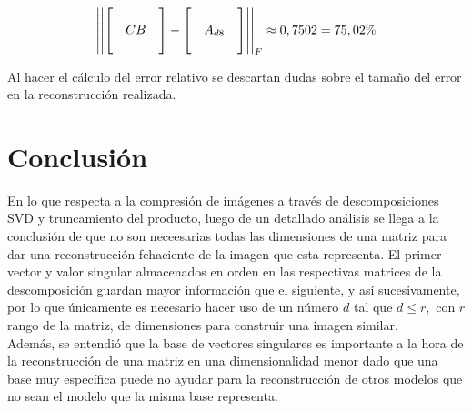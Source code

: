 \documentclass[12pt,a4]{article} %
\begin{document}
\begin{equation}
    \centering
    \left|\left|\begin{bmatrix}
            &   &   \\
            &CB &   \\
            &   &   
    \end{bmatrix} - \begin{bmatrix}
            &   &   \\
            &A_{d8}&    \\
            &   &   
    \end{bmatrix}\right|\right|_F \approx 0,7502 = 75,02\%
\end{equation}

Al hacer el cálculo del error relativo se descartan dudas sobre el tamaño del error en la reconstrucción realizada.

\section{Conclusión}
En lo que respecta a la compresión de imágenes a través de descomposiciones SVD y truncamiento del producto, luego de un detallado análisis se llega a la conclusión de que no son neceesarias todas las dimensiones de una matriz para dar una reconstrucción fehaciente de la imagen que esta representa. El primer vector y valor singular almacenados en orden en las respectivas matrices de la descomposición guardan mayor información que el siguiente, y así sucesivamente, por lo que únicamente es necesario hacer uso de un número $d$ tal que $d \leq r,$ con $r$ rango de la matriz, de dimensiones para construir una imagen similar.
\\

Además, se entendió que la base de vectores singulares es importante a la hora de la reconstrucción de una matriz en una dimensionalidad menor dado que una base muy específica puede no ayudar para la reconstrucción de otros modelos que no sean el modelo que la misma base representa.

\appendix




\printbibliography
\end{document}
